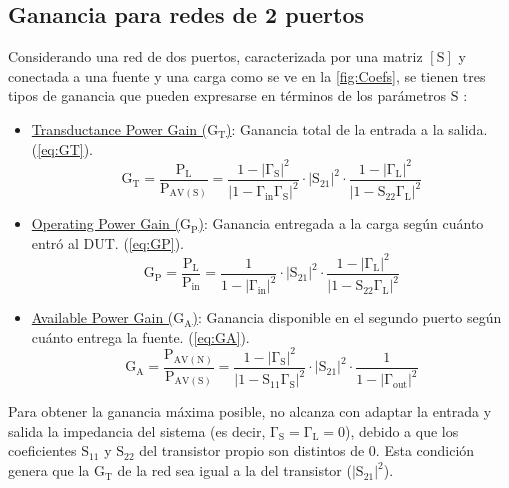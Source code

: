 \documentclass{article}
\begin{document}
\subsection{Ganancia para redes de 2 puertos} \label{section:sec_2.4}
Considerando una red de dos puertos, caracterizada por una matriz $\mathrm{[S]}$ y conectada a una fuente y una carga como se ve en la \autoref{fig:Coefs}, se tienen tres tipos de ganancia que pueden expresarse en términos de los parámetros $\mathrm{S}$ \cite[p.~559]{pozar_microwave}:
\begin{itemize}
    \item \underline{Transductance Power Gain ($\mathrm{G_{T}}$)}: Ganancia total de la entrada a la salida. (\autoref{eq:GT}).
    \begin{equation}
        \mathrm{G_{T} = \frac{P_{L}}{P_{AV(S)}} = \frac{1 - |\Gamma_{S}|^{2}}{|1 - \Gamma_{in} \Gamma_{S}|^{2}} \cdot |S_{21}|^{2} \cdot \frac{1 - |\Gamma_{L}|^{2}}{|1 - S_{22}\Gamma_{L}|^{2}}}
        \label{eq:GT}
    \end{equation}
    
    \item \underline{Operating Power Gain ($\mathrm{G_{P}}$)}: Ganancia entregada a la carga según cuánto entró al DUT. (\autoref{eq:GP}).
    \begin{equation}
        \mathrm{G_{P} = \frac{P_{L}}{P_{in}} = \frac{1}{1 - |\Gamma_{in}|^{2}} \cdot |S_{21}|^{2} \cdot \frac{1 - |\Gamma_{L}|^{2}}{|1 - S_{22}\Gamma_{L}|^{2}}}
        \label{eq:GP}
    \end{equation}
    
    \item \underline{Available Power Gain ($\mathrm{G_{A}}$)}: Ganancia disponible en el segundo puerto según cuánto entrega la fuente. (\autoref{eq:GA}).
    \begin{equation}
        \mathrm{G_{A} = \frac{P_{AV(N)}}{P_{AV(S)}} = \frac{1 - |\Gamma_{S}|^{2}}{|1 - S_{11}\Gamma_{S}|^{2}} \cdot |S_{21}|^{2} \cdot \frac{1}{1 - |\Gamma_{out}|^{2}}}
        \label{eq:GA}
    \end{equation}
\end{itemize}

Para obtener la ganancia máxima posible, no alcanza con adaptar la entrada y salida la impedancia del sistema (es decir, $\mathrm{\Gamma_{S} = \Gamma_{L} = 0}$), debido a que los coeficientes $\mathrm{S_{11}}$ y $\mathrm{S_{22}}$ del transistor propio son distintos de 0. Esta condición genera que la $\mathrm{G_{T}}$ de la red sea igual a la del transistor ($\mathrm{|S_{21}|^{2}}$).
\end{document}
